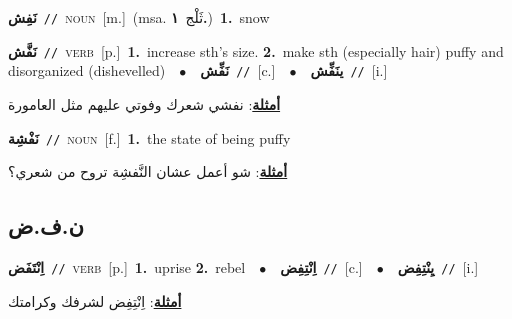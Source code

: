 \documentclass[10pt,a4paper,twoside]{article} %
\begin{document}
\begin{multicols}{2}
{\setlength\topsep{0pt}\textbf{\foreignlanguage{arabic}{نَفِش}}\ {\color{gray}\texttt{//}\color{black}}\ \textsc{noun}\ [m.]\ \color{gray}(msa. \foreignlanguage{arabic}{ثَلْج}~\foreignlanguage{arabic}{\textbf{١.}})\color{black}\ \textbf{1.}~snow\ } \vspace{2mm}

{\setlength\topsep{0pt}\textbf{\foreignlanguage{arabic}{نَفَّش}}\ {\color{gray}\texttt{//}\color{black}}\ \textsc{verb}\ [p.]\ \textbf{1.}~increase sth's size.  \textbf{2.}~make sth (especially hair) puffy and disorganized (dishevelled)\ \ $\bullet$\ \ \setlength\topsep{0pt}\textbf{\foreignlanguage{arabic}{نَفِّش}}\ {\color{gray}\texttt{//}\color{black}}\ [c.]\ \ $\bullet$\ \ \setlength\topsep{0pt}\textbf{\foreignlanguage{arabic}{ينَفِّش}}\ {\color{gray}\texttt{//}\color{black}}\ [i.]\  \begin{flushright}\color{gray}\foreignlanguage{arabic}{\textbf{\underline{\foreignlanguage{arabic}{أمثلة}}}: نفشي شعرك وفوتي عليهم مثل العامورة}\end{flushright}\color{black}} \vspace{2mm}

{\setlength\topsep{0pt}\textbf{\foreignlanguage{arabic}{نَفْشِة}}\ {\color{gray}\texttt{//}\color{black}}\ \textsc{noun}\ [f.]\ \textbf{1.}~the state of being puffy\  \begin{flushright}\color{gray}\foreignlanguage{arabic}{\textbf{\underline{\foreignlanguage{arabic}{أمثلة}}}: شو أعمل عشان النَّفشِة تروح من شعري؟}\end{flushright}\color{black}} \vspace{2mm}

\vspace{-3mm}
\subsection*{\color{blue}\foreignlanguage{arabic}{ن.ف.ض}\color{blue}{}} 

{\setlength\topsep{0pt}\textbf{\foreignlanguage{arabic}{اِنْتَفَض}}\ {\color{gray}\texttt{//}\color{black}}\ \textsc{verb}\ [p.]\ \textbf{1.}~uprise  \textbf{2.}~rebel\ \ $\bullet$\ \ \setlength\topsep{0pt}\textbf{\foreignlanguage{arabic}{اِنْتِفِض}}\ {\color{gray}\texttt{//}\color{black}}\ [c.]\ \ $\bullet$\ \ \setlength\topsep{0pt}\textbf{\foreignlanguage{arabic}{يِنْتِفِض}}\ {\color{gray}\texttt{//}\color{black}}\ [i.]\  \begin{flushright}\color{gray}\foreignlanguage{arabic}{\textbf{\underline{\foreignlanguage{arabic}{أمثلة}}}: اِنْتِفِض لشرفك وكرامتك}\end{flushright}\color{black}} \vspace{2mm}


\end{multicols}
\end{document}
